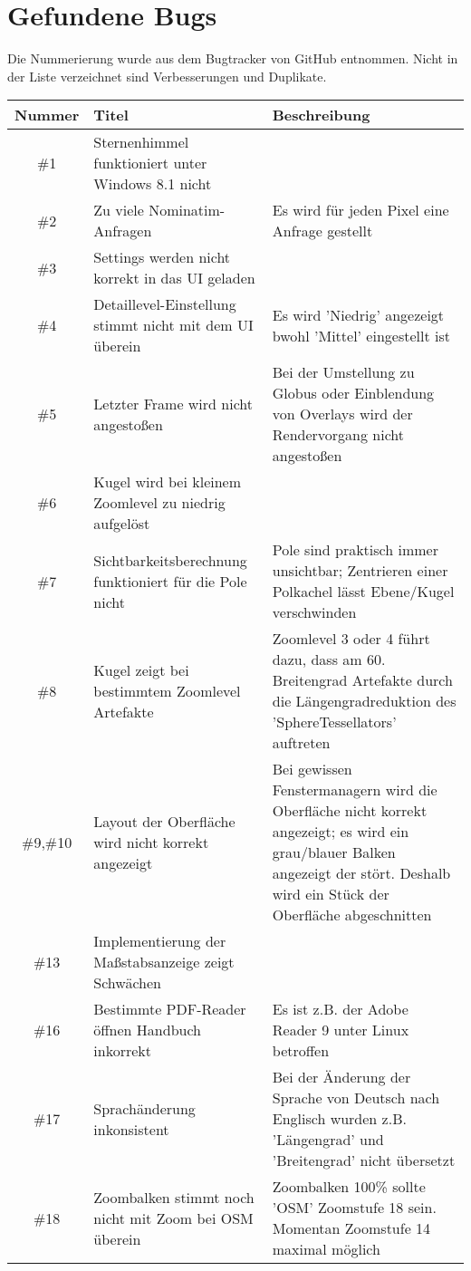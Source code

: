 \documentclass[10pt]{scrreprt}
\begin{document}
\section{Gefundene Bugs}
Die Nummerierung wurde aus dem Bugtracker von GitHub entnommen.
Nicht in der Liste verzeichnet sind Verbesserungen und Duplikate.
\begin{longtable}{|c|p{5.2cm}|p{8.2cm}|}
\hline
Nummer & Titel & Beschreibung \\
\hline
\hline
\#1 & Sternenhimmel funktioniert unter Windows 8.1 nicht & \\
\hline
\#2 & Zu viele Nominatim-Anfragen & Es wird für jeden Pixel eine Anfrage gestellt \\
\hline
\#3 & Settings werden nicht korrekt in das UI geladen & \\
\hline
\#4 & Detaillevel-Einstellung stimmt nicht mit dem UI überein & Es wird 'Niedrig' angezeigt
 bwohl 'Mittel' eingestellt ist \\
\hline
\#5 & Letzter Frame wird nicht angestoßen & Bei der Umstellung zu Globus oder Einblendung von Overlays wird der Rendervorgang nicht angestoßen\\
\hline
\#6 & Kugel wird bei kleinem Zoomlevel zu niedrig aufgelöst & \\
\hline
\#7 & Sichtbarkeitsberechnung funktioniert für die Pole nicht & Pole sind praktisch immer unsichtbar; Zentrieren einer Polkachel lässt Ebene/Kugel verschwinden \\
\hline
\#8 & Kugel zeigt bei bestimmtem Zoomlevel Artefakte & Zoomlevel 3 oder 4 führt dazu, dass am 60. Breitengrad Artefakte durch die Längengradreduktion des 'SphereTessellators' auftreten \\
\hline
\#9,\#10 & Layout der Oberfläche wird nicht korrekt angezeigt & Bei gewissen Fenstermanagern wird die Oberfläche nicht korrekt angezeigt; es wird ein grau/blauer Balken angezeigt der stört. Deshalb wird ein Stück der Oberfläche abgeschnitten \\
\hline
\#13 & Implementierung der Maßstabsanzeige zeigt Schwächen & \\
\hline
\#16 & Bestimmte PDF-Reader öffnen Handbuch inkorrekt & Es ist z.B. der Adobe Reader 9 unter Linux betroffen \\
\hline
\#17 & Sprachänderung inkonsistent & Bei der Änderung der Sprache von Deutsch nach Englisch wurden z.B. 'Längengrad' und 'Breitengrad' nicht übersetzt\\
\hline
\#18 & Zoombalken stimmt noch nicht mit Zoom bei OSM überein & Zoombalken 100\% sollte 'OSM' Zoomstufe 18 sein. Momentan Zoomstufe 14 maximal möglich\\

\end{longtable}
\end{document}
